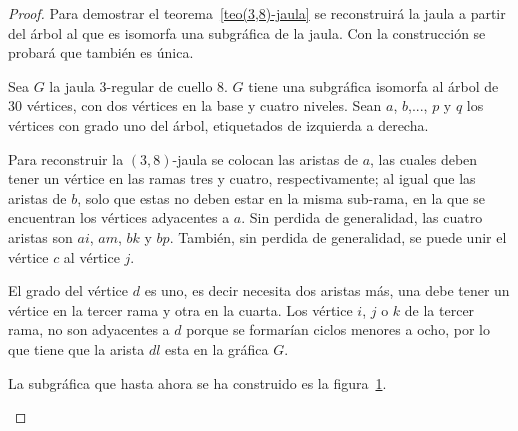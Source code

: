\documentclass[12pt]{book}
\theoremstyle{definition}
\begin{document}
\begin{proof} Para demostrar el teorema~\ref{teo(3,8)-jaula} se
  reconstruirá la jaula a partir del árbol al que es isomorfa una
  subgráfica de la jaula. Con la construcción se probará que también
  es única.

Sea $G$ la jaula 3-regular de cuello 8. $G$ tiene una subgráfica
isomorfa al árbol de 30 vértices, con dos vértices en la base y cuatro
niveles. Sean $a$, $b$,..., $p$ y $q$ los vértices con grado uno del
árbol, etiquetados de izquierda a derecha.

Para reconstruir la $(3,8)$-jaula se colocan las
aristas de $a$, las cuales deben tener un vértice en las ramas tres y
cuatro, respectivamente; al igual que las aristas de $b$, solo que
estas no deben estar en la misma sub-rama, en la que se encuentran los vértices
adyacentes a $a$. Sin perdida de generalidad, las cuatro aristas son
$ai$, $am$, $bk$ y $bp$. También, sin perdida de generalidad, se puede
unir el vértice $c$ al vértice $j$. 

El grado del vértice $d$ es uno, es decir necesita dos aristas más,
una debe tener un vértice en la tercer rama y otra en la cuarta. Los
vértice $i$, $j$ o $k$ de la tercer rama, no son adyacentes a $d$
porque se formarían ciclos menores a ocho, por lo que tiene que la
arista $dl$ esta en la gráfica $G$. 

La subgráfica que hasta ahora se ha construido es la figura~\ref{arbol(3,8)}.


\begin{figure}
  \centering
  \caption{} \label{arbol(3,8)}
\end{figure}


\end{proof}
\end{document}

